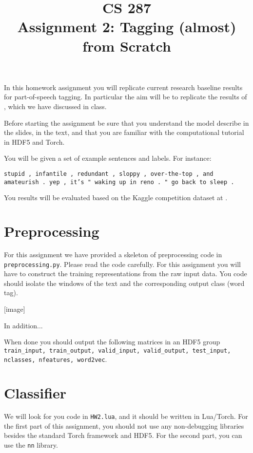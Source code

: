 \documentclass[11pt]{article}
\title{CS 287 \\ Assignment 2: Tagging (almost) from Scratch }
\date{}
\begin{document}
\maketitle{}

In this homework assignment you will replicate current
research baseline results for part-of-speech tagging.
In particular the aim will be to replicate the results 
of , which we have discussed 
in class. 

Before 
starting the assignment be sure that you understand the model 
describe in the slides, in the text, and that you are familiar 
with the computational tutorial in HDF5 and Torch. 


You will be given a set of example sentences and labels. For instance: 


\vspace{0.5cm}

\noindent
\texttt{stupid , infantile , redundant , sloppy , over-the-top , and amateurish . yep , it's " waking up in reno . " go back to sleep . }

You results will be evaluated based on the Kaggle competition dataset at \url{}.

\section{Preprocessing}

For this assignment we have provided a skeleton of preprocessing
code in \texttt{preprocessing.py}. Please read the code carefully.
For this assignment you will have to construct the training 
representations from the raw input data. You code should isolate 
the windows of the text and the corresponding output class (word tag).


[image]

In addition...

When done you should output the following matrices in an HDF5 group
\texttt{train\_input, train\_output, valid\_input, valid\_output,
  test\_input, nclasses, nfeatures, word2vec}.


\section{Classifier}

We will look for you code in \texttt{HW2.lua}, and it should be
written in Lua/Torch. For the first part of this assignment, you
should not use any non-debugging libraries besides the standard Torch
framework and HDF5. For the second part, you can use the \texttt{nn}
library.
\end{document}
